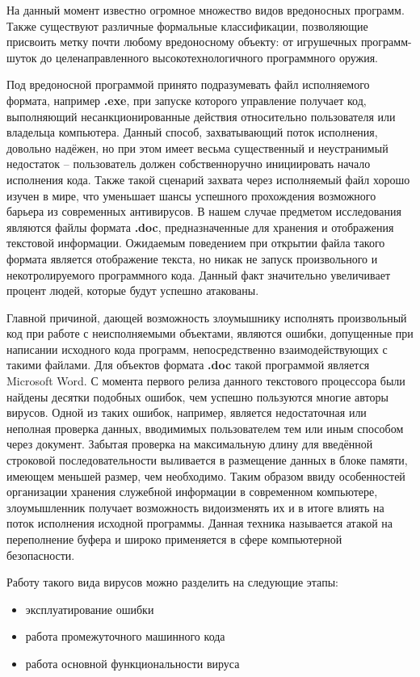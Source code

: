 На данный момент известно огромное множество видов вредоносных программ.
Также существуют различные формальные классификации, позволяющие присвоить метку почти любому вредоносному объекту: от игрушечных программ-шуток до целенаправленного высокотехнологичного программного оружия.

Под вредоносной программой принято подразумевать файл исполняемого формата, например \textbf{.exe}, при запуске которого управление получает код, выполняющий несанкционированные действия относительно пользователя или владельца компьютера. 
Данный способ, захватывающий поток исполнения, довольно надёжен, но при этом имеет весьма существенный и неустранимый недостаток -- пользователь должен собственноручно инициировать начало исполнения кода.
Также такой сценарий захвата через исполняемый файл хорошо изучен в мире, что уменьшает шансы успешного прохождения возможного барьера из современных антивирусов.
В нашем случае предметом исследования являются файлы формата \textbf{.doc}, предназначенные для хранения и отображения текстовой информации. 
Ожидаемым поведением при открытии файла такого формата является отображение текста, но никак не запуск произвольного и некотролируемого программного кода.
Данный факт значительно увеличивает процент людей, которые будут успешно атакованы.

Главной причиной, дающей возможность злоумышнику исполнять произвольный код при работе с неисполняемыми объектами, являются ошибки, допущенные при написании исходного кода программ, непосредственно взаимодействующих с такими файлами. 
Для объектов формата \textbf{.doc} такой программой является Microsoft Word.
С момента первого релиза данного текстового процессора были найдены десятки подобных ошибок, чем успешно пользуются многие авторы вирусов.
Одной из таких ошибок, например, является недостаточная или неполная проверка данных, вводимимых пользователем тем или иным способом через документ.
Забытая проверка на максимальную длину для введённой строковой последовательности выливается в размещение данных в блоке памяти, имеющем меньшей размер, чем необходимо. 
Таким образом ввиду особенностей организации хранения служебной информации в современном компьютере, злоумышленник получает возможность видоизменять их и в итоге влиять на поток исполнения исходной программы.
Данная техника называется атакой на переполнение буфера и широко применяется в сфере компьютерной безопасности.

Работу такого вида вирусов можно разделить на следующие этапы:

\begin{itemize}
\item эксплуатирование ошибки
\item работа промежуточного машинного кода
\item работа основной функциональности вируса
\end{itemize}

